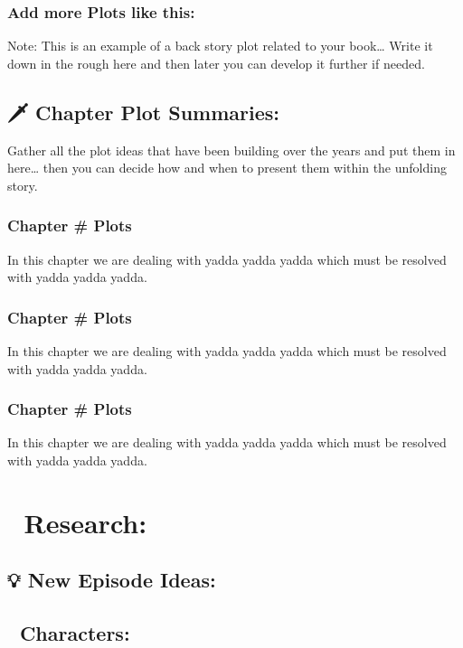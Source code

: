 \documentclass[11pt]{article}
\begin{document}
\subsubsection{Add more Plots like this:}
\label{sec:orgde83826}

Note: This is an example of a back story plot related to your book\ldots{} Write it down in the rough here and then later you can develop it further if needed.

\subsection{🗡 Chapter Plot Summaries:}
\label{sec:orgd996eb9}

Gather all the plot ideas that have been building over the years and put them in here\ldots{} then you can decide how and when to present them within the unfolding story.

\subsubsection{Chapter \# Plots}
\label{sec:org3ca7808}

In this chapter we are dealing with  yadda yadda yadda which must be resolved with yadda yadda yadda.

\subsubsection{Chapter \# Plots}
\label{sec:orgb78f7e9}

In this chapter we are dealing with  yadda yadda yadda which must be resolved with yadda yadda yadda.

\subsubsection{Chapter \# Plots}
\label{sec:org320dff3}

In this chapter we are dealing with  yadda yadda yadda which must be resolved with yadda yadda yadda.
\section{📒 Research:}
\label{sec:orgd41fc0e}
\subsection{💡 New Episode Ideas:}
\label{sec:org91ae945}
\subsection{👤 Characters:}
\label{sec:org0c194c3}
\end{document}
